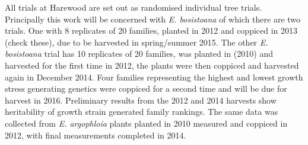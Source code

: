 All trials at Harewood are set out as randomised individual tree trials. Principally
this work will be concerned with \textit{E. bosistoana} of which there  are two
trials. One with 8 replicates of 20 families, planted in 2012 and coppiced in
2013 (check these), due to be harvested in spring/summer 2015. The other
\textit{E. bosistoana} trial has 10 replicates of 20 families, was planted in
(2010) and harvested for the first time in 2012, the plants were then coppiced
and harvested again in December 2014. Four families representing the highest and
lowest growth stress generating genetics were coppiced for a second time and
will be due for harvest in 2016. Preliminary results from the 2012 and 2014
harvests show heritability of growth strain generated family
rankings. The same data was collected from \textit{E. argophloia} plants planted
in 2010 measured and coppiced in 2012, with final measurements completed in 2014.